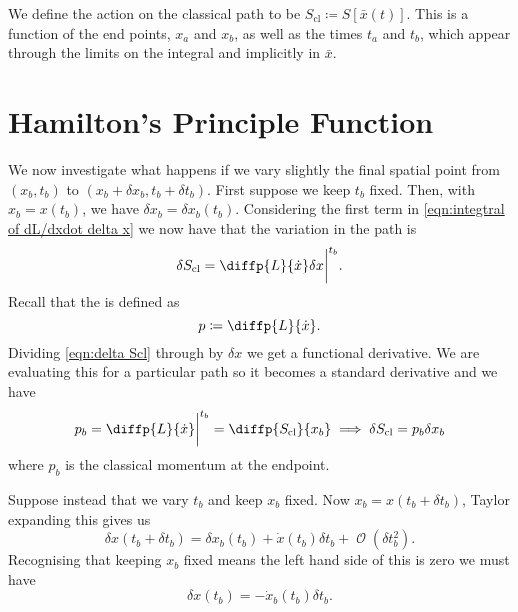 \documentclass[fleqn]{NotesClass}
\newcommand*{\order}{\mathop{\mathcal{O}}}
\newcommand*{\lagrangian}{L}
\newcommand*{\cl}{\mathrm{cl}}
\begin{document}
    We define the action on the classical path to be \(S_{\cl} \coloneqq S[\bar{x}(t)]\).
    This is a function of the end points, \(x_a\) and \(x_b\), as well as the times \(t_a\) and \(t_b\), which appear through the limits on the integral and implicitly in \(\bar{x}\).
    
    \section{Hamilton's Principle Function}
    We now investigate what happens if we vary slightly the final spatial point from \((x_b, t_b)\) to \((x_b + \delta x_b, t_b + \delta t_b)\).
    First suppose we keep \(t_b\) fixed.
    Then, with \(x_b = x(t_b)\), we have \(\delta x_b = \delta x_b(t_b)\).
    Considering the first term in \cref{eqn:integtral of dL/dxdot delta x} we now have that the variation in the path is
    \begin{equation}\label{eqn:delta Scl}
        \delta S_{\cl} = \diffp{\lagrangian}{\dot{x}} \delta x\bigg\vert^{t_b}.
    \end{equation}
    Recall that the  is defined as
    \begin{equation}
        p \coloneqq \diffp{\lagrangian}{\dot{x}}.
    \end{equation}
    Dividing \cref{eqn:delta Scl} through by \(\delta x\) we get a functional derivative.
    We are evaluating this for a particular path so it becomes a standard derivative and we have
    \begin{equation}\label{eqn:dS = p dx}
        p_b = \diffp{\lagrangian}{\dot{x}}\bigg|^{t_b} = \diffp{S_{\cl}}{x_b} \implies \delta S_{\cl} = p_b\delta x_b
    \end{equation}
    where \(p_b\) is the classical momentum at the endpoint.
    
    Suppose instead that we vary \(t_b\) and keep \(x_b\) fixed.
    Now \(x_b = x(t_b + \delta t_b)\), Taylor expanding this gives us
    \begin{equation}
        \delta x(t_b + \delta t_b) = \delta x_b(t_b) + \dot{x}(t_b)\delta t_b + \order(\delta t_b^2).
    \end{equation}
    Recognising that keeping \(x_b\) fixed means the left hand side of this is zero we must have
    \begin{equation}
        \delta x(t_b) = -\dot{x}_b(t_b) \delta t_b.
    \end{equation}
    
\end{document}
